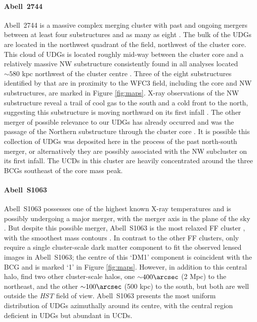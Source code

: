 \documentclass[iop,tighten,twocolumn,apj,floatfix]{emulateapj}
\begin{document}
\paragraph{Abell~2744} Abell~2744 is a massive complex merging cluster with
past and ongoing mergers between at least four substructures \citep{owers2011,
merten2011, medezinski2016} and as many as eight \citep{jauzac2016}.
The bulk of the UDGs are located in the
northwest quadrant of the field, northwest of the cluster core.
This cloud of UDGs is located roughly mid-way between the cluster core and a
relatively massive NW substructure consistently found in all analyses located ${\sim}580$ kpc
northwest of the cluster centre \citep{merten2011, medezinski2016,
jauzac2016}.
Three of the eight substructures identified by \cite{jauzac2016} that are in
proximity to the WFC3 field, including the core and NW substructures, are
marked in Figure \ref{fig:maps}.
X-ray observations of the NW substructure reveal a trail of cool gas to the south
and a cold front to the north, suggesting this substructure is moving
northward on its first infall \citep{jauzac2016}.
The other merger of possible relevance to our UDGs has already occurred and
was the passage of the Northern substructure through the cluster core
\citep{owers2011, merten2011, medezinski2016}.
It is possible this collection of UDGs was deposited here in the process of
the past north-south merger, or alternatively they are possibly associated
with the NW subcluster on its first infall.
The UCDs in this cluster are heavily concentrated around the three BCGs
southeast of the core mass peak.

\paragraph{Abell~S1063} Abell~S1063 possesses one of the highest known X-ray
temperatures and is possibly undergoing a major merger, with the merger axis in the plane
of the sky \citep{gomez2012}.
But despite this possible merger, Abell~S1063 is the most relaxed FF cluster
\citep{lotz2017}, with the smoothest mass contours \citep{gruen2013,
diego2016}.
In contrast to the other FF clusters, \cite{richard2014} only require a single
cluster-scale dark matter component to fit the observed lensed images in
Abell~S1063; the centre of this `DM1' component is coincident with the BCG and
is marked `1' in Figure \ref{fig:maps}.
However, in addition to this central halo, \cite{johnson2014} find two other
cluster-scale halos, one ${\sim}400\arcsec$ (2 Mpc) to the northeast, and the
other ${\sim}100\arcsec$ (500 kpc) to the south, but both are well outside the
\textit{HST} field of view.
Abell~S1063 presents the most uniform distribution of UDGs azimuthally around
its centre, with the central region deficient in UDGs but abundant in UCDs.
\end{document}
